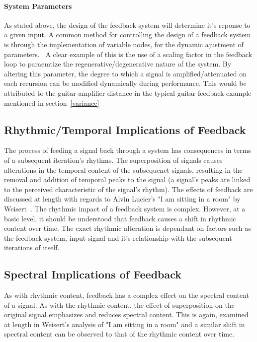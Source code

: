 \documentclass[titlepage]{scrartcl}
\begin{document}
    \paragraph{System Parameters}
    As stated above, the design of the feedback system will determine it's
    reponse to a given input. A common method for controlling the design of a
    feedback system is through the implementation of variable nodes, for the
    dynamic ajustment of parameters.~\parencite[p.19-27]{weisert2010ioi}
    A clear example of this is the use of a scaling factor in the feedback loop
    to paraemtize the regenerative/degenerative nature of the system. By
    altering this parameter, the degree to which a signal is
    amplified/attenuated on each recursion can be modified dynamically during
    performance. This would be attributed to the guitar-amplifier distance in
    the typical guitar feedback example mentioned in section~\ref{variance}

    \subsection{Rhythmic/Temporal Implications of Feedback}
    The process of feeding a signal back through a system has consequences in
    terms of a subsequent iteration's rhythms. The superposition of signals
    causes alterations in the temporal content of the subsequenct signals,
    resulting in the removal and addition of temporal peaks to the signal (a
    signal's peaks are linked to the perceived characteristic of the signal's
    rhythm).  The effects of feedback are discussed at length with regards to
    Alvin Lucier's "I am sitting in a room" by
    Weisert~\parencite[p.64-68]{weisert2010ioi}. The rhythmic impact of a
    feedback system is complex. However, at a basic level, it should be
    understood that feedback causes a shift in rhythmic content over time.  The
    exact rhythmic alteration is dependant on factors such as the feedback
    system, input signal and it's relationship with the subsequent iterations
    of itself.

    \subsection{Spectral Implications of Feedback}
    As with rhythmic content, feedback has a complex effect on the spectral
    content of a signal. As with the rhythmic content, the effect of
    superposition on the original signal emphasizes and reduces spectral
    content. This is again, examined at length in Weisert's analysis of "I am
    sitting in a room" and a similar shift in spectral content can be observed
    to that of the rhythmic content over
    time.~\parencite[p.60-64]{weisert2010ioi}
    
\end{document}
